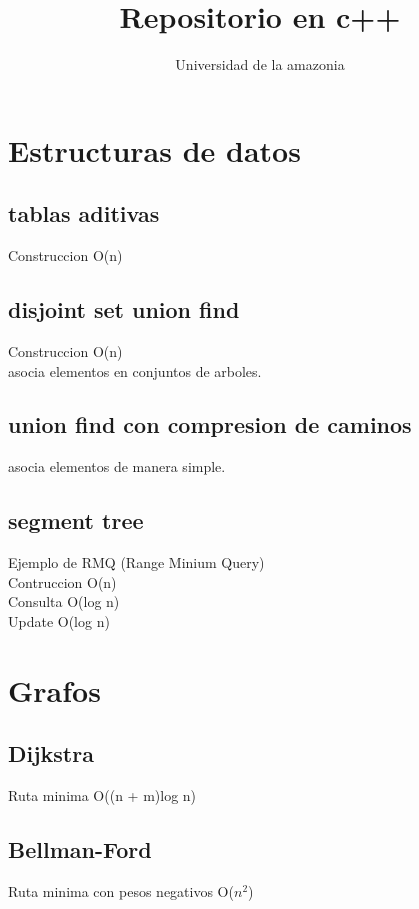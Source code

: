 \documentclass[10pt,landscape,twocolumn,a4paper,notitlepage]{article}
\newcommand\cppfile[2][]{

}
\begin{document}
	
	\title{Repositorio en c++}
	\author{Universidad de la amazonia}
	\maketitle
	
	\tableofcontents\newpage
	
		\section{Estructuras de datos}
			\subsection{tablas aditivas}
			Construccion O(n)
			\cppfile[16-28]{estructuras_de_datos/tablas_aditivas.cpp}
			\subsection{disjoint set union find}
			Construccion O(n)\\asocia elementos en conjuntos de arboles.
			\cppfile[6-53]{estructuras_de_datos/union_find.cpp}
			\subsection{union find con compresion de caminos}
			asocia elementos de manera simple.
			\cppfile[7-40]{estructuras_de_datos/union_find-compresion_de_caminos.cpp}
			\subsection{segment tree}
			Ejemplo de RMQ (Range Minium Query)\\
			Contruccion O(n)\\Consulta O(log n)\\Update O(log n)
			\cppfile[8-70]{estructuras_de_datos/segment_tree.cpp}
			
		\section{Grafos}
			\subsection{Dijkstra}
			Ruta minima
			O((n + m)log n)
			\cppfile[6-38]{grafos/dijkstra_con_priority_queue.cpp}
			\subsection{Bellman-Ford}
			Ruta minima con pesos negativos
			O($n^{2}$)
			\cppfile[5-39]{grafos/bellman-Ford.cpp}
\end{document}
